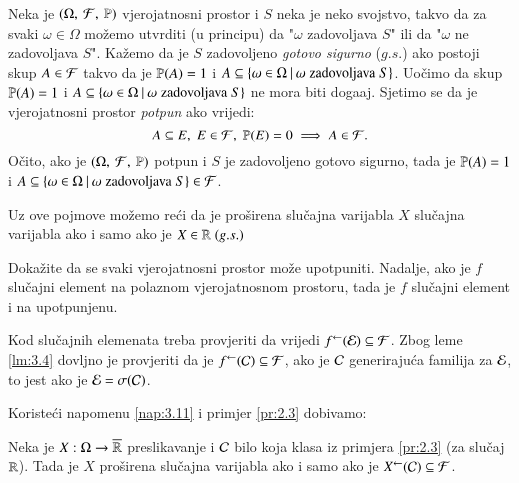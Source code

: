 \begin{nap} \label{nap:3.9}
    Neka je $(\Omega, \: \mathcal{F}, \: \mathbb{P})$ vjerojatnosni prostor i $S$ neka je neko svojstvo, takvo da za svaki $\omega \in \Omega$ mo\v zemo utvrditi (u principu) da "$\omega$ zadovoljava $S$" ili da "$\omega$ ne zadovoljava $S$".
    Ka\v zemo da je $S$ zadovoljeno \emph{gotovo sigurno} ($g.s.$) ako postoji skup $A \in \mathcal{F}$ takvo da je $\mathbb{P}({A}) = 1$ i $A \subseteq \{{\omega \in \Omega} \: | \: {\omega \; \textnormal{zadovoljava} \; S}\}$.
    Uo\v cimo da skup $\mathbb{P}({A}) = 1$ i $A \subseteq \{{\omega \in \Omega} \: | \: {\omega \; \textnormal{zadovoljava} \; S}\}$ ne mora biti doga\dj aj.
    Sjetimo se da je vjerojatnosni prostor \emph{potpun} ako vrijedi:
    \begin{equation*}
        A \subseteq E, \; E \in \mathcal{F}, \; \mathbb{P}({E}) = 0 \implies A \in \mathcal{F}.
    \end{equation*}
    O\v cito, ako je $(\Omega, \: \mathcal{F}, \: \mathbb{P})$ potpun i $S$ je zadovoljeno gotovo sigurno, tada je $\mathbb{P}({A}) = 1$ i $A \subseteq \{{\omega \in \Omega} \: | \: {\omega \; \textnormal{zadovoljava} \; S}\} \in \mathcal{F}$.

    Uz ove pojmove mo\v zemo re\' ci da je pro\v sirena slu\v cajna varijabla $X$ slu\v cajna varijabla ako i samo ako je $X \in \mathbb{R} \; (g.s.)$
\end{nap}

\begin{zad} \label{zad:3.10}
    Doka\v zite da se svaki vjerojatnosni prostor mo\v ze upotpuniti.
    Nadalje, ako je $f$ slu\v cajni element na polaznom vjerojatnosnom
    prostoru, tada je $f$ slu\v cajni element i na upotpunjenu.
\end{zad}

%
%

\begin{nap} \label{nap:3.11}
    Kod slu\v cajnih elemenata treba provjeriti da vrijedi ${f}^{\leftarrow}(\mathcal{E}) \subseteq \mathcal{F}$. Zbog leme \ref{lm:3.4} dovljno je provjeriti da je ${f}^{\leftarrow}(\mathcal{C}) \subseteq \mathcal{F}$, ako je $\mathcal{C}$ generiraju\' ca familija za $\mathcal{E}$, to jest ako je $\mathcal{E} = \sigma({\mathcal{C}})$.
\end{nap}

Koriste\' ci napomenu \ref{nap:3.11} i primjer \ref{pr:2.3} dobivamo:

\begin{kor} \label{kor:3.12}
    Neka je $X : \Omega \to \overline{\mathbb{R}}$ preslikavanje i $\mathcal{C}$ bilo koja klasa iz primjera \ref{pr:2.3} (za slu\v caj $\mathbb{R}$).
    Tada je $X$ pro\v sirena slu\v cajna varijabla ako i samo ako je ${X}^{\leftarrow}(\mathcal{C}) \subseteq \mathcal{F}$.
\end{kor}

